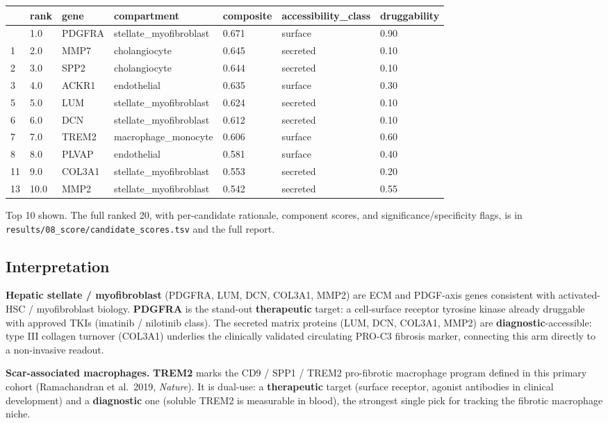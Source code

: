 \documentclass[
  10pt,
  letterpaper,
  DIV=11,
  numbers=noendperiod]{scrartcl}
\newcounter{none} %
\begin{document}
{\def\LTcaptype{none} %
\begin{longtable}[]{@{}lllllll@{}}
\toprule\noalign{}
& rank & gene & compartment & composite & accessibility\_class &
druggability \\
\midrule\noalign{}
\endhead
\bottomrule\noalign{}
\endlastfoot
0 & 1.0 & PDGFRA & stellate\_myofibroblast & 0.671 & surface & 0.90 \\
1 & 2.0 & MMP7 & cholangiocyte & 0.645 & secreted & 0.10 \\
2 & 3.0 & SPP2 & cholangiocyte & 0.644 & secreted & 0.10 \\
3 & 4.0 & ACKR1 & endothelial & 0.635 & surface & 0.30 \\
5 & 5.0 & LUM & stellate\_myofibroblast & 0.624 & secreted & 0.10 \\
6 & 6.0 & DCN & stellate\_myofibroblast & 0.612 & secreted & 0.10 \\
7 & 7.0 & TREM2 & macrophage\_monocyte & 0.606 & surface & 0.60 \\
8 & 8.0 & PLVAP & endothelial & 0.581 & surface & 0.40 \\
11 & 9.0 & COL3A1 & stellate\_myofibroblast & 0.553 & secreted & 0.20 \\
13 & 10.0 & MMP2 & stellate\_myofibroblast & 0.542 & secreted & 0.55 \\
\end{longtable}
}

Top 10 shown. The full ranked 20, with per-candidate rationale,
component scores, and significance/specificity flags, is in
\texttt{results/08\_score/candidate\_scores.tsv} and the full report.

\subsection{Interpretation}\label{interpretation}

\textbf{Hepatic stellate / myofibroblast} (PDGFRA, LUM, DCN, COL3A1,
MMP2) are ECM and PDGF-axis genes consistent with activated-HSC /
myofibroblast biology. \textbf{PDGFRA} is the stand-out
\textbf{therapeutic} target: a cell-surface receptor tyrosine kinase
already druggable with approved TKIs (imatinib / nilotinib class). The
secreted matrix proteins (LUM, DCN, COL3A1, MMP2) are
\textbf{diagnostic}-accessible: type III collagen turnover (COL3A1)
underlies the clinically validated circulating PRO-C3 fibrosis marker,
connecting this arm directly to a non-invasive readout.

\textbf{Scar-associated macrophages.} \textbf{TREM2} marks the CD9 /
SPP1 / TREM2 pro-fibrotic macrophage program defined in this primary
cohort (Ramachandran et al.~2019, \emph{Nature}). It is dual-use: a
\textbf{therapeutic} target (surface receptor, agonist antibodies in
clinical development) and a \textbf{diagnostic} one (soluble TREM2 is
measurable in blood), the strongest single pick for tracking the
fibrotic macrophage niche.
\end{document}

